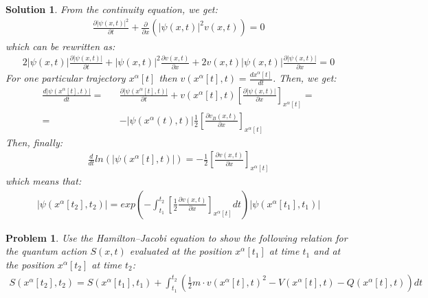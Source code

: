 \documentclass[nofootinbib, secnumarabic, amsmath, nobibnotes,11pt,aps,pra, floatfix]{revtex4-1}
\newtheorem{problem}{Problem}
\newtheorem{solution}{Solution}
\begin{document}
\begin{solution}
From the continuity equation, we get:
\begin{eqnarray}
\frac{\partial |\psi(x,t)|^2}{\partial t}+\frac{\partial }{\partial x} \left(|\psi(x,t)|^2 v(x,t)\right)=0\nonumber
\end{eqnarray}
which can be rewritten as: 
\begin{eqnarray}
2|\psi(x,t)|\frac{\partial |\psi(x,t)|}{\partial t}+|\psi(x,t)|^2\frac{\partial v(x,t)}{\partial x}+2v(x,t)|\psi(x,t)|\frac{\partial |\psi(x,t)|}{\partial x}=0\nonumber
\end{eqnarray}
For one particular trajectory $x^{\alpha}[t]$ then $v(x^{\alpha}[t],t)=\frac {dx^{\alpha}[t]}{dt}$. Then, we get: 
\begin{eqnarray}
\frac{d |\psi(x^{\alpha}[t],t)|}{dt}=&&\frac{\partial |\psi(x^{\alpha}[t],t)|}{\partial t}+v(x^{\alpha}[t],t)\left[\frac{\partial |\psi(x,t)|}{\partial x}\right]_{x^{\alpha}[t]}=\nonumber\\=&&-|\psi(x^{\alpha}(t),t)|\frac{1}{2}\left[\frac{\partial v_B(x,t)}{\partial x}\right]_{x^{\alpha}[t]}\nonumber
\end{eqnarray}
Then, finally:
\begin{eqnarray}
\frac{d}{dt}  ln \left(|\psi(x^{\alpha}[t],t)|\right)=-\frac{1}{2}\left[ \frac{\partial v(x,t)}{\partial x}\right]_{x^{\alpha}[t]}\nonumber
\end{eqnarray}
which means that:
\begin{eqnarray}
|\psi(x^{\alpha}[t_2],t_2)|=exp\left(-\int_{t_1}^{t_2}\left[\frac{1}{2}\frac{\partial v(x,t)}{\partial x}\right]_{x^{\alpha}[t]}dt \right) |\psi(x^{\alpha}[t_1],t_1)|\nonumber
\end{eqnarray}
\end{solution}


\begin{problem} \label{om.P10}
Use the Hamilton--Jacobi equation to show the following relation for the quantum action $S(x,t)$ evaluated at the position $x^{\alpha}[t_1]$ at time $t_1$ and at the position $x^{\alpha}[t_2]$ at time $t_2$:
\begin{eqnarray}
S(x^{\alpha}[t_2],t_2)=S(x^{\alpha}[t_1],t_1) +\int_{t_1}^{t_2}\left( \frac{1}{2}m\cdot v(x^{\alpha}[t],t)^2 -V(x^{\alpha}[t],t)-Q(x^{\alpha}[t],t)\right)dt \nonumber
\end{eqnarray}
\end{problem}
\end{document}
